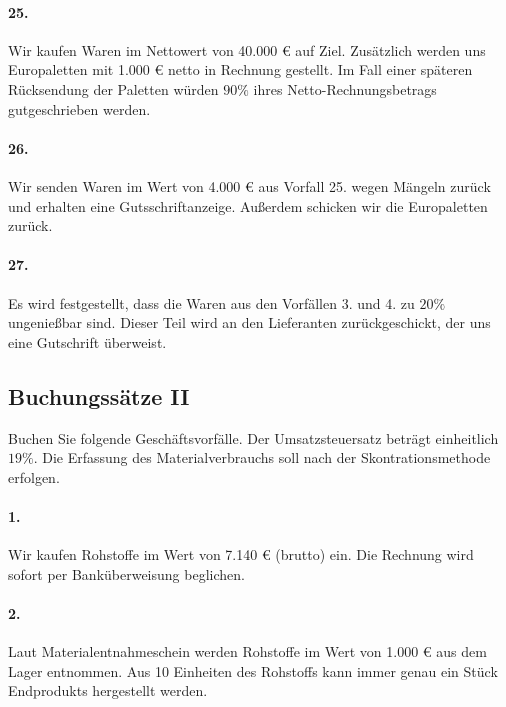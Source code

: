 \documentclass[paper=a4, fontsize=11pt]{scrartcl}
\numberwithin{equation}{section}
\numberwithin{figure}{section}
\numberwithin{table}{section}
\begin{document}
{\paragraph{25.}
Wir kaufen Waren im Nettowert von 40.000 € auf Ziel. Zusätzlich werden uns Europaletten mit 1.000 € netto in Rechnung gestellt. Im Fall einer späteren Rücksendung der Paletten würden $90 \%$ ihres Netto-Rechnungsbetrags gutgeschrieben werden. \\  

\paragraph{26.}
Wir senden Waren im Wert von 4.000 € aus Vorfall 25. wegen Mängeln zurück und erhalten eine Gutsschriftanzeige. Außerdem schicken wir die Europaletten zurück. \\

\paragraph{27.}
Es wird festgestellt, dass die Waren aus den Vorfällen 3. und 4. zu $20 \%$  ungenießbar sind. Dieser Teil wird an den Lieferanten zurückgeschickt, der uns eine Gutschrift überweist. \\

\subsection{Buchungssätze II}
Buchen Sie folgende Geschäftsvorfälle. Der Umsatzsteuersatz beträgt einheitlich $19 \%$. Die Erfassung des Materialverbrauchs soll nach der Skontrationsmethode erfolgen. \\

\paragraph{1.}
Wir kaufen Rohstoffe im Wert von 7.140 € (brutto) ein. Die Rechnung wird sofort per Banküberweisung beglichen. \\

\paragraph{2.}
Laut Materialentnahmeschein werden Rohstoffe im Wert von 1.000 € aus dem Lager entnommen. Aus 10 Einheiten des Rohstoffs kann immer genau ein Stück Endprodukts hergestellt werden. \\

}
\end{document}
